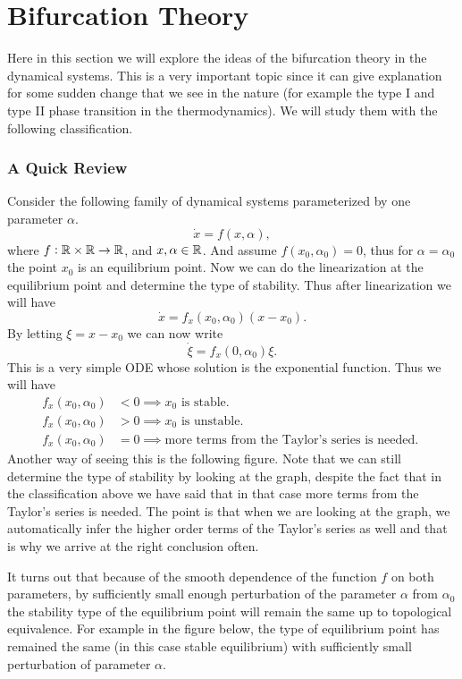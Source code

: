 \section{Bifurcation Theory}

Here in this section we will explore the ideas of the bifurcation theory in the dynamical systems. This is a very important topic since it can give explanation for some sudden change that we see in the nature (for example the type I and type II phase transition in the thermodynamics). We will study them with the following classification.

\subsubsection{A Quick Review}
Consider the following family of dynamical systems parameterized by one parameter $\alpha$. 
\[ \dot{x} = f(x,\alpha), \]
where $f:\mathbb{R} \times \mathbb{R} \to \mathbb{R}$, and $x,\alpha \in \mathbb{R}$. And assume $f(x_0,\alpha_0)=0$, thus for $\alpha=\alpha_0$ the point $x_0$ is an equilibrium point. Now we can do the linearization at the equilibrium point and determine the type of stability. Thus after linearization we will have
\[ \dot{x} = f_x(x_0,\alpha_0) (x-x_0). \]
By letting $\xi = x - x_0$ we can now write
\[ \dot{\xi} = f_x(0,\alpha_0) \xi. \]
This is a very simple ODE whose solution is the exponential function. Thus we will have
\begin{align*}
	f_x(x_0,\alpha_0) &< 0 \implies \text{$x_0$ is stable}.\\
	f_x(x_0,\alpha_0) &> 0 \implies \text{$x_0$ is unstable}.\\
	f_x(x_0,\alpha_0) &=0 \implies \text{more terms from the Taylor's series is needed. } 
\end{align*}
Another way of seeing this is the following figure. Note that we can still determine the type of stability by looking at the graph, despite the fact that in the classification above we have said that in that case more terms from the Taylor's series is needed. The point is that when we are looking at the graph, we automatically infer the higher order terms of the Taylor's series as well and that is why we arrive at the right conclusion often.


It turns out that because of the smooth dependence of the function $f$ on both parameters, by sufficiently small enough perturbation of the parameter $\alpha$ from $\alpha_0$ the stability type of the equilibrium point will remain the same up to topological equivalence. For example in the figure below, the type of equilibrium point has remained the same (in this case stable equilibrium) with sufficiently small perturbation of parameter $\alpha$.


